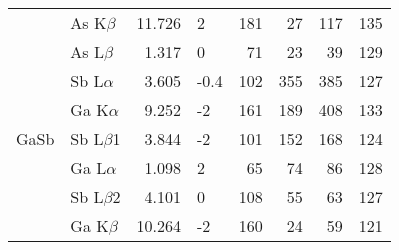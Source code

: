 \begin{table}[phtb]
\begin{center}
\begin{tabular}{llrlrrrp{2.5cm}}
                              & As K$\beta$   & 11.726          & 2                   & 181           & 27                & 117                & 135                                   \\
                              & As L$\beta$   & 1.317           & 0                   & 71            & 23                & 39                 & 129                                   \\
            \hline
                              & Sb L$\alpha$  & 3.605           & -0.4                & 102           & 355               & 385                & 127                                   \\
                              & Ga K$\alpha$  & 9.252           & -2                  & 161           & 189               & 408                & 133                                   \\
            GaSb              & Sb L$\beta$1  & 3.844           & -2                  & 101           & 152               & 168                & 124                                   \\
                              & Ga L$\alpha$  & 1.098           & 2                   & 65            & 74                & 86                 & 128                                   \\
                              & Sb L$\beta$2  & 4.101           & 0                   & 108           & 55                & 63                 & 127                                   \\
                              & Ga K$\beta$   & 10.264          & -2                  & 160           & 24                & 59                 & 121                                   \\
            \hline
        \end{tabular}
    \end{center}
\end{table}
